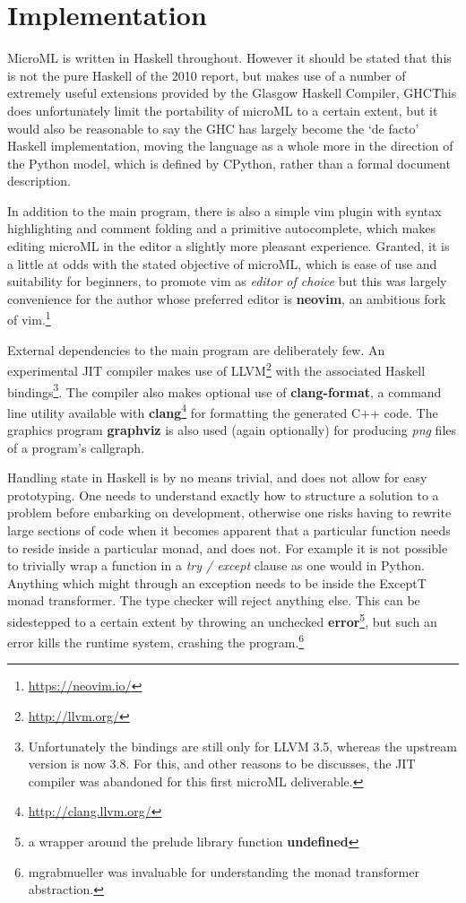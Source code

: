 \documentclass[12pt, a4paper]{report}
\begin{document}
\section{Implementation}
MicroML is written in Haskell throughout. However it should be stated that this is not the pure
Haskell of the 2010 report, but makes use of a number of extremely useful extensions provided by
the Glasgow Haskell Compiler, GHC\. This does unfortunately limit the portability of microML to a certain extent, 
but it would also be reasonable to say the GHC has largely become the `de facto' Haskell implementation, moving the
language as a whole more in the direction of the Python model, which is defined by CPython, 
rather than a formal document description.

In addition to the main program, there is also a simple vim plugin with syntax highlighting and
comment folding and a primitive autocomplete, which makes editing microML in the editor a slightly more pleasant experience.
Granted, it is a little at odds with the stated objective of microML, which is ease of use and
suitability for beginners, to promote vim as \textit{editor of choice} but this was largely
convenience for the author whose preferred editor is \textbf{neovim}, an ambitious fork of
vim.\footnote{\url{https://neovim.io/}} 

External dependencies to the main program are deliberately few. An experimental JIT compiler makes
use of LLVM\footnote{\url{http://llvm.org/}} with the associated Haskell
bindings\footnote{Unfortunately the bindings are still only for LLVM 3.5, whereas the upstream
version is now 3.8. For this, and other reasons to be discusses, the JIT compiler was abandoned for
this first microML deliverable.}. The compiler also makes optional use of \textbf{clang-format}, a
command line utility available with \textbf{clang}\footnote{\url{http://clang.llvm.org/}} for formatting 
the generated C++ code. The graphics program \textbf{graphviz} is also used (again optionally) for 
producing \textit{png} files of a program's callgraph. 

Handling state in Haskell is by no means trivial, and does not allow for easy prototyping. One needs
to understand exactly how to structure a solution to a problem before embarking on development,
otherwise one risks having to rewrite large sections of code when it becomes apparent that a
particular function needs to reside inside a particular monad, and does not. For example it is not
possible to trivially wrap a function in a \textit{try / except} clause as one would in Python.
Anything which might through an exception needs to be inside the ExceptT monad transformer. The type
checker will reject anything else. This can be sidestepped to a certain extent by throwing an
unchecked \textbf{error}\footnote{a wrapper around the prelude library function \textbf{undefined}},
but such an error kills the runtime system, crashing the program.\footnote{mgrabmueller was
invaluable for understanding the monad transformer abstraction.}
\end{document}
